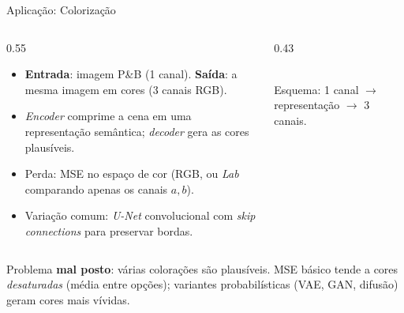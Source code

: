 \documentclass[aspectratio=169,xcolor=dvipsnames]{beamer}
\begin{document}
  \begin{frame}{Aplicação: Colorização}
    \begin{columns}[T]
      \begin{column}{0.55\textwidth}
        \begin{itemize}
          \item \textbf{Entrada}: imagem P\&B (1 canal).
          \textbf{Saída}: a mesma imagem em cores (3 canais RGB).
          \item \textit{Encoder} comprime a cena em uma representação
          semântica; \textit{decoder} gera as cores plausíveis.
          \item Perda: MSE no espaço de cor (RGB, ou \textit{Lab}
          comparando apenas os canais $a, b$).
          \item Variação comum: \textit{U-Net} convolucional com
          \textit{skip connections} para preservar bordas.
        \end{itemize}
        \vspace{0.3em}
      \end{column}
      \begin{column}{0.43\textwidth}
        \centering
        \\
        \vspace{0.4em}
        \scriptsize Esquema: 1 canal $\to$ representação $\to$ 3 canais.
      \end{column}
    \end{columns}
            \footnotesize Problema \textbf{mal posto}: várias colorações
        são plausíveis. MSE básico tende a cores \emph{desaturadas}
        (média entre opções); variantes probabilísticas (VAE, GAN,
        difusão) geram cores mais vívidas.
  \end{frame}
\end{document}
